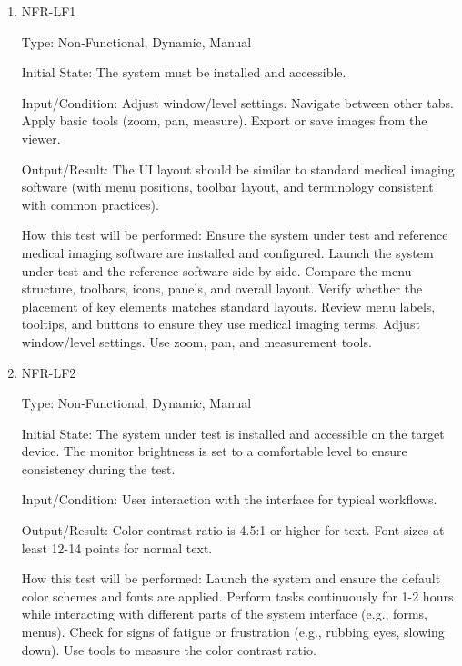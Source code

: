 \documentclass[12pt, titlepage]{article}
\begin{document}
\begin{enumerate}

\item{NFR-LF1\\}\label{NFR-LF1}

Type: Non-Functional, Dynamic, Manual

Initial State: The system must be installed and accessible.

Input/Condition: Adjust window/level settings. Navigate between other tabs. Apply basic tools (zoom, pan, measure). Export or save images from the viewer.

Output/Result: The UI layout should be similar to standard medical imaging software (with menu positions, toolbar layout, and terminology consistent with common practices).

How this test will be performed: Ensure the system under test and reference medical imaging software are installed and configured. Launch the system under test and the reference software side-by-side. Compare the menu structure, toolbars, icons, panels, and overall layout. Verify whether the placement of key elements matches standard layouts. Review menu labels, tooltips, and buttons to ensure they use medical imaging terms. Adjust window/level settings. Use zoom, pan, and measurement tools.

\item{NFR-LF2\\}\label{NFR-LF2}

Type: Non-Functional, Dynamic, Manual

Initial State: The system under test is installed and accessible on the target device. The monitor brightness is set to a comfortable level to ensure consistency during the test.

Input/Condition: User interaction with the interface for typical workflows.

Output/Result: Color contrast ratio is 4.5:1 or higher for text. Font sizes at least 12-14 points for normal text.

How this test will be performed: Launch the system and ensure the default color schemes and fonts are applied. Perform tasks continuously for 1-2 hours while interacting with different parts of the system interface (e.g., forms, menus). Check for signs of fatigue or frustration (e.g., rubbing eyes, slowing down). Use tools to measure the color contrast ratio.

\end{enumerate}
\end{document}

